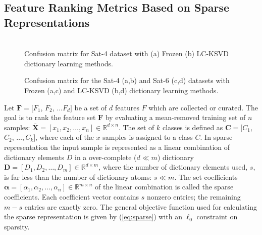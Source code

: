 \subsection{Feature Ranking Metrics Based on Sparse Representations}\label{ssec:FR_metric}





\begin{figure*}[!t]%
\centering
{}%
\qquad
{}\\
\caption{Confusion matrix for Sat-4 dataset with (a) Frozen (b) LC-KSVD dictionary learning methods.}\label{fig: sat4_rslt}%


%
\qquad
{}
\caption[]{Confusion matrix for the Sat-4 (a,b) and Sat-6 (c,d) datasets with Frozen (a,c) and LC-KSVD (b,d) dictionary learning methods.}%
\label{fig: sat6_rslt}%
\end{figure*}

Let $\mathbf{F} = [F_1$, $F_2$, $\dots F_d]$ be a set of $d$ features $F$ which are collected or curated. The goal is to rank the feature set $\mathbf{F}$ by evaluating a mean-removed training set of $n$ samples: $\mathbf{\bar{X}} = [x_1, x_2, \dots, x_n] \in \mathbb{R}^{d \times n}$. The set of $k$ classes is defined as $\mathbf{C} = [C_1$, $C_2$, $\dots, C_k]$, where each of the $x$ samples is assigned to a class $C$. In sparse representation the input sample is represented as a linear combination of dictionary elements $D$ in a over-complete ($d \ll m$) dictionary $\mathbf{D} = [D_1, D_2, \dots, D_m] \in \mathbb{R}^{d \times m}$, where the number of dictionary elements used, $s$, is far less than the number of dictionary atoms: $s \ll m$. The set coefficients $\bm{\alpha} = [\alpha_1, \alpha_2, \dots, \alpha_n] \in \mathbb{R}^{m \times n}$ of the linear combination is called the sparse coefficients. Each coefficient vector contains $s$ nonzero entries; the remaining $m-s$ entries are exactly zero. The general objective function used for calculating the sparse representation is given by (\ref{eq:sparse}) with an $\ell_0$ constraint on sparsity.

